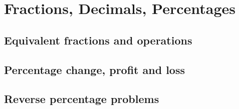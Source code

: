 
\section{Fractions, Decimals, Percentages}

\subsection{Equivalent fractions and operations}


\subsection{Percentage change, profit and loss}


\subsection{Reverse percentage problems}

